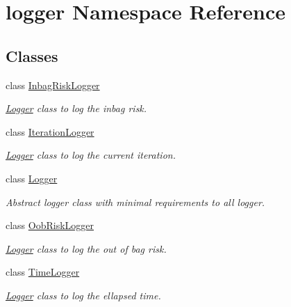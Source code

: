 \hypertarget{namespacelogger}{}\section{logger Namespace Reference}
\label{namespacelogger}
\subsection*{Classes}
\begin{DoxyCompactItemize}
\item 
class \hyperlink{classlogger_1_1_inbag_risk_logger}{Inbag\+Risk\+Logger}
\begin{DoxyCompactList}\small\item\em \hyperlink{classlogger_1_1_logger}{Logger} class to log the inbag risk. \end{DoxyCompactList}\item 
class \hyperlink{classlogger_1_1_iteration_logger}{Iteration\+Logger}
\begin{DoxyCompactList}\small\item\em \hyperlink{classlogger_1_1_logger}{Logger} class to log the current iteration. \end{DoxyCompactList}\item 
class \hyperlink{classlogger_1_1_logger}{Logger}
\begin{DoxyCompactList}\small\item\em Abstract logger class with minimal requirements to all logger. \end{DoxyCompactList}\item 
class \hyperlink{classlogger_1_1_oob_risk_logger}{Oob\+Risk\+Logger}
\begin{DoxyCompactList}\small\item\em \hyperlink{classlogger_1_1_logger}{Logger} class to log the out of bag risk. \end{DoxyCompactList}\item 
class \hyperlink{classlogger_1_1_time_logger}{Time\+Logger}
\begin{DoxyCompactList}\small\item\em \hyperlink{classlogger_1_1_logger}{Logger} class to log the ellapsed time. \end{DoxyCompactList}\end{DoxyCompactItemize}
